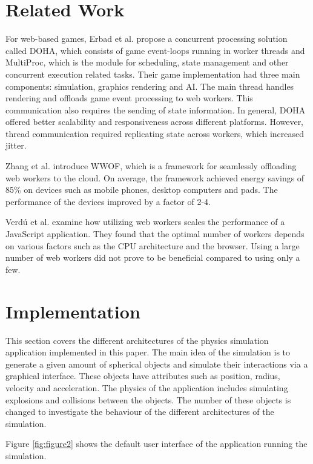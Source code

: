 \documentclass[conference]{IEEEtran}
\begin{document}
\section{Related Work}
\label{sec:soa}

For web-based games, Erbad et al. \cite{doha} propose a concurrent processing solution called DOHA, which consists of game event-loops running in worker threads and MultiProc, which is the module for scheduling, state management and other concurrent execution related tasks. Their game implementation had three main components: simulation, graphics rendering and AI. The main thread handles rendering and offloads game event processing to web workers. This communication also requires the sending of state information. In general, DOHA offered better scalability and responsiveness across different platforms. However, thread communication required replicating state across workers, which increased jitter.

Zhang et al. \cite{zhang} introduce WWOF, which is a framework for seamlessly offloading web workers to the cloud. On average, the framework achieved energy savings of 85\% on devices such as mobile phones, desktop computers and pads. The performance of the devices improved by a factor of 2-4.

Verdú et al. \cite{verdu} examine how utilizing web workers scales the performance of a JavaScript application. They found that the optimal number of workers depends on various factors such as the CPU architecture and the browser. Using a large number of web workers did not prove to be beneficial compared to using only a few.

\section{Implementation}
\label{sec:implementation}

This section covers the different architectures of the physics simulation application implemented in this paper. The main idea of the simulation is to generate a given amount
of spherical objects and simulate their interactions via a graphical interface. These objects have attributes such as position, radius, velocity and acceleration. The 
physics of the application includes simulating explosions and collisions between the objects. The number of these objects is changed to investigate the behaviour
of the different architectures of the simulation.

Figure \ref{fig:figure2} shows the default user interface of the application running the simulation.
\end{document}
